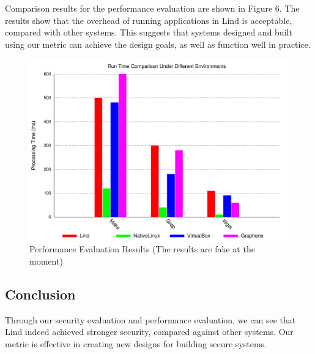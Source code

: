 Comparison results for the performance evaluation are shown in Figure 6.
The results show that the overhead of running applications in Lind is acceptable, compared with other systems. 
This suggests that systems designed and built using our metric can achieve the design goals, as well as function well in practice. 

\begin{figure}[h]
\centering
\includegraphics[width=1.0\columnwidth]{diagram/lind_ccs15_diagram_05.pdf}
\caption{Performance Evaluation Results {\color{red}(The results are fake at the moment)}}
\label{fig:performance_evaluation_results}
\end{figure}

\subsection{Conclusion}
Through our security evaluation and performance evaluation, we can see that 
Lind indeed achieved stronger security, compared against other systems.
Our metric is effective in creating new designs for building secure systems. 
